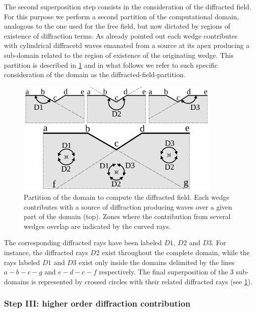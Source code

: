 \documentclass[11pt,letterpaper]{article}
\begin{document}
The second superposition step consists in the consideration of the diffracted field. For this purpose we perform a second partition of the computational domain, analogous to the one used for the free field, but now dictated by regions of existence of diffraction terms. As already pointed out each wedge contributes with cylindrical diffracetd waves emanated from a source at its apex producing a sub-domain related to the region of existence of the originating wedge. This partition is described in \cref{fig:zones of diffraction} and in what follows we refer to such specific consideration of the domain as the diffracted-field-partition.

\begin{figure}[H]
\centering
\includegraphics[width=10cm]{IMAGES/00_Propuesta_2.pdf}
\caption{Partition of the domain to compute the diffracted field. Each wedge contributes with a source of diffraction producing waves over a given part of the domain (top). Zones where the contribution from several wedges overlap are indicated by the curved rays.}
\label{fig:zones of diffraction}
\end{figure}


The corresponding diffracted rays have been labeled $D1$, $D2$ and $D3$. For instance, the diffracted rays $D2$ exist throughout the complete domain, while the rays labeled $D1$ and $D3$ exist only inside the domains delimited by the lines $a-b-c-g$ and $e-d-c-f$ respectively. The final superposition of the 3 sub-domains is represented by crossed circles with their related diffracted rays (see \cref{fig:zones of diffraction}).

\subsubsection*{Step III: higher order diffraction contribution}
\end{document}
